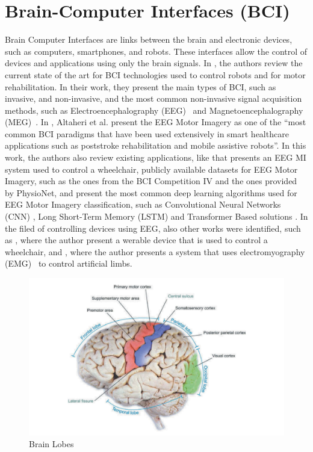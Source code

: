 \section{Brain-Computer Interfaces (BCI)}
Brain Computer Interfaces are links between the brain and electronic devices, such as computers, smartphones, and robots.
These interfaces allow the control of devices and applications using only the brain signals.
In \cite{robinson2021emerging}, the authors review the current state of the art for BCI technologies used to control robots and for motor rehabilitation.
In their work, they present the main types of BCI, such as invasive, and non-invasive, and the most common non-invasive signal acquisition methods, such as Electroencephalography (EEG)~\cite{niedermeyer2005electroencephalography} and Magnetoencephalography (MEG)~\cite{singh2014magnetoencephalography}.
In \cite{altaheri_deep_2023}, Altaheri et al. present the EEG Motor Imagery as one of the ``most common BCI paradigms that have been used extensively in smart healthcare applications such as poststroke rehabilitation and mobile assistive robots''.
In this work, the authors also review existing applications, like \cite{tang2020motor} that presents an EEG MI system used to control a wheelchair, publicly available datasets for EEG Motor Imagery, such as the ones from the BCI Competition IV and the ones provided by PhysioNet\cite{goldberger2000physiobank, schalk2004bci2000}, and present the most common deep learning algorithms used for EEG Motor Imagery classification, such as Convolutional Neural Networks (CNN) \cite{lawhern2018eegnet}, Long Short-Term Memory (LSTM) and Transformer Based solutions \cite{sharma_deep_2023}.
In the filed of controlling devices using EEG, also other works were identified, such as \cite{10471624}, where the author present a werable device that is used to control a wheelchair, and \cite{10453986}, where the author presents a system that uses electromyography (EMG)~\cite{mills2005basics} to control artificial limbs.
\begin{figure}[htbp!]
    \centering
    \includegraphics[width=\textwidth]{Figures/Related/brain_lobes}
    \caption{Brain Lobes}
\end{figure}
